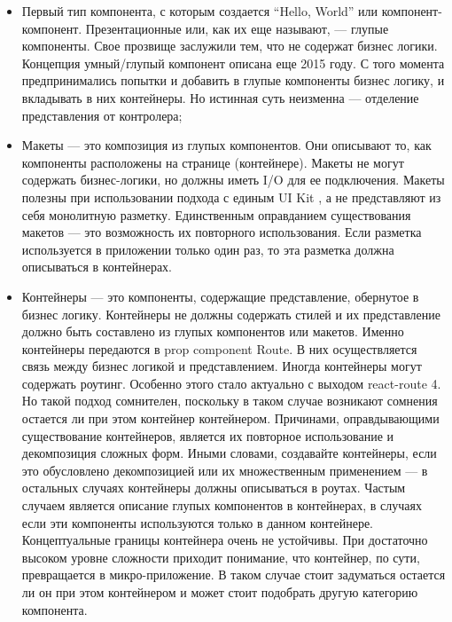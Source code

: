 \begin{itemize}
    \item Первый тип компонента, с которым создается “Hello, World” или компонент-компонент.
    Презентационные или, как их еще называют, — глупые компоненты. Свое прозвище заслужили тем, что не содержат бизнес логики.
    Концепция умный/глупый компонент описана еще 2015 году.
    С того момента предпринимались попытки и добавить в глупые компоненты бизнес логику, и вкладывать в них контейнеры.
    Но истинная суть неизменна — отделение представления от контролера;
    \item Макеты — это композиция из глупых компонентов.
    Они описывают то, как компоненты расположены на странице (контейнере).
    Макеты не могут содержать бизнес-логики, но должны иметь I/O для ее подключения.
    Макеты полезны при использовании подхода с единым UI Kit , а не представляют из себя монолитную разметку.
    Единственным оправданием существования макетов — это возможность их повторного использования.
    Если разметка используется в приложении только один раз, то эта разметка должна описываться в контейнерах.
    \item Контейнеры — это компоненты, содержащие представление, обернутое в бизнес логику.
    Контейнеры не должны содержать стилей и их представление должно быть составлено из глупых компонентов или макетов.
    Именно контейнеры передаются в prop component Route. В них осуществляется связь между бизнес логикой и представлением.
    Иногда контейнеры могут содержать роутинг. Особенно этого стало актуально с выходом react-route 4.
    Но такой подход сомнителен, поскольку в таком случае возникают сомнения остается ли при этом контейнер контейнером.
    Причинами, оправдывающими существование контейнеров, является их повторное использование и декомпозиция сложных форм.
    Иными словами, создавайте контейнеры, если это обусловлено декомпозицией или их множественным применением — в остальных случаях контейнеры должны описываться в роутах.
    Частым случаем является описание глупых компонентов в контейнерах, в случаях если эти компоненты используются только в данном контейнере.
    Концептуальные границы контейнера очень не устойчивы.
    При достаточно высоком уровне сложности приходит понимание, что контейнер, по сути, превращается в микро-приложение.
    В таком случае стоит задуматься остается ли он при этом контейнером и может стоит подобрать другую категорию компонента.
\end{itemize}

\subsubsection{}

